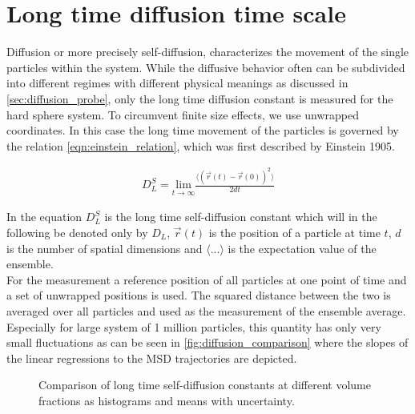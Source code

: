 \section{Long time diffusion time scale}
\label{sec:diffusion_metastable_liquid}
Diffusion or more precisely self-diffusion, characterizes the movement of the single particles within the system. While the diffusive behavior often can be subdivided into different regimes with different physical meanings as discussed in \autoref{sec:diffusion_probe}, only the long time diffusion constant is measured for the hard sphere system. To circumvent finite size effects, we use unwrapped coordinates. In this case the long time movement of the particles is governed by the relation \autoref{eqn:einstein_relation}, which was first described by Einstein 1905\cite{Albert1905}.

\begin{align}
\label{eqn:einstein_relation}
D^S_L = \underset{t\rightarrow \infty}{\text{lim}} \frac{\langle (\vec{r}(t) - \vec{r}(0) )^2 \rangle}{2 d t}
\end{align}

In the equation $D^S_L$ is the long time self-diffusion constant which will in the following be denoted only by $D_L$, $\vec{r}(t)$ is the position of a particle at time $t$, $d$ is the number of spatial dimensions and $\langle ... \rangle$ is the expectation value of the ensemble.\\

For the measurement a reference position of all particles at one point of time and a set of unwrapped positions is used. The squared distance between the two is averaged over all particles and used as the measurement of the ensemble average. Especially for large system of 1 million particles, this quantity has only very small fluctuations as can be seen in \autoref{fig:diffusion_comparison} where the slopes of the linear regressions to the MSD trajectories are depicted.\\

\begin{figure}[h]
 \hspace{0.5cm}
\caption[Long time self-diffusion constant measurements from production data]{Comparison of long time self-diffusion constants at different volume fractions as histograms and means with uncertainty.}
\label{fig:diffusion_comparison}
\end{figure}

